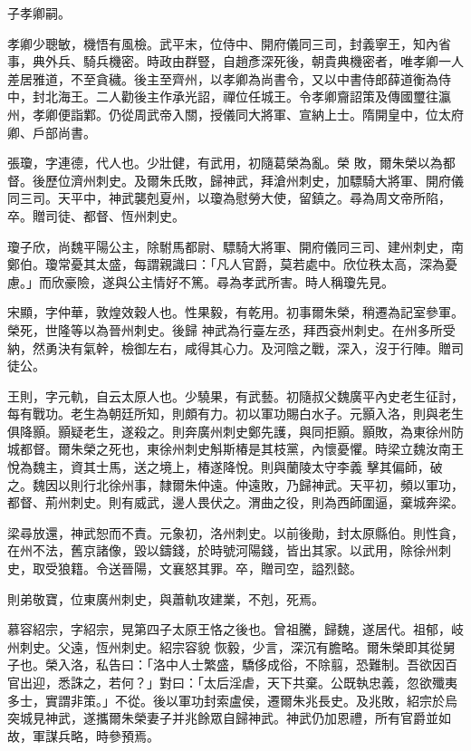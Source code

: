 \begin{pinyinscope}
 子孝卿嗣。



 孝卿少聰敏，機悟有風檢。武平末，位侍中、開府儀同三司，封義寧王，知內省事，典外兵、騎兵機密。時政由群豎，自趙彥深死後，朝貴典機密者，唯孝卿一人差居雅道，不至貪穢。後主至齊州，以孝卿為尚書令，又以中書侍郎薛道衡為侍中，封北海王。二人勸後主作承光詔，禪位任城王。令孝卿齎詔策及傳國璽往瀛州，孝卿便詣鄴。仍從周武帝入關，授儀同大將軍、宣納上士。隋開皇中，位太府卿、戶部尚書。



 張瓊，字連德，代人也。少壯健，有武用，初隨葛榮為亂。榮
 敗，爾朱榮以為都督。後歷位濟州刺史。及爾朱氏敗，歸神武，拜滄州刺史，加驃騎大將軍、開府儀同三司。天平中，神武襲剋夏州，以瓊為慰勞大使，留鎮之。尋為周文帝所陷，卒。贈司徒、都督、恆州刺史。



 瓊子欣，尚魏平陽公主，除駙馬都尉、驃騎大將軍、開府儀同三司、建州刺史，南鄭伯。瓊常憂其太盛，每謂親識曰：「凡人官爵，莫若處中。欣位秩太高，深為憂慮。」而欣豪險，遂與公主情好不篤。尋為孝武所害。時人稱瓊先見。



 宋顯，字仲華，敦煌效穀人也。性果毅，有乾用。初事爾朱榮，稍遷為記室參軍。榮死，世隆等以為晉州刺史。後歸
 神武為行臺左丞，拜西袞州刺史。在州多所受納，然勇決有氣幹，檢御左右，咸得其心力。及河陰之戰，深入，沒于行陣。贈司徒公。



 王則，字元軌，自云太原人也。少驍果，有武藝。初隨叔父魏廣平內史老生征討，每有戰功。老生為朝廷所知，則頗有力。初以軍功賜白水子。元顥入洛，則與老生俱降顥。顥疑老生，遂殺之。則奔廣州刺史鄭先護，與同拒顥。顥敗，為東徐州防城都督。爾朱榮之死也，東徐州刺史斛斯椿是其枝黨，內懷憂懼。時梁立魏汝南王悅為魏主，資其士馬，送之境上，椿遂降悅。則與蘭陵太守李義
 擊其偏師，破之。魏因以則行北徐州事，隸爾朱仲遠。仲遠敗，乃歸神武。天平初，頻以軍功，都督、荊州刺史。則有威武，邊人畏伏之。渭曲之役，則為西師圍逼，棄城奔梁。



 梁尋放還，神武恕而不責。元象初，洛州刺史。以前後勛，封太原縣伯。則性貪，在州不法，舊京諸像，毀以鑄錢，於時號河陽錢，皆出其家。以武用，除徐州刺史，取受狼籍。令送晉陽，文襄怒其罪。卒，贈司空，謚烈懿。



 則弟敬寶，位東廣州刺史，與蕭軌攻建業，不剋，死焉。



 慕容紹宗，字紹宗，晃第四子太原王恪之後也。曾祖騰，歸魏，遂居代。祖郁，岐州刺史。父遠，恆州刺史。紹宗容貌
 恢毅，少言，深沉有膽略。爾朱榮即其從舅子也。榮入洛，私告曰：「洛中人士繁盛，驕侈成俗，不除翦，恐難制。吾欲因百官出迎，悉誅之，若何？」對曰：「太后淫虐，天下共棄。公既執忠義，忽欲殲夷多士，實謂非策。」不從。後以軍功封索盧侯，遷爾朱兆長史。及兆敗，紹宗於烏突城見神武，遂攜爾朱榮妻子并兆餘眾自歸神武。神武仍加恩禮，所有官爵並如故，軍謀兵略，時參預焉。




\end{pinyinscope}
